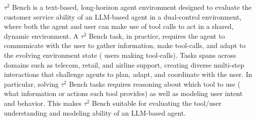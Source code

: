 $\tau^{2}$ Bench \citep{barres2025tau2benchevaluatingconversationalagents} is a text-based, long-horizon agent environment designed to evaluate the customer service ability of an LLM-based agent in a dual-control environment, where both the agent and user can make use of tool calls to act in a shared, dynamic environment.
A $\tau^{2}$ Bench task, in practice, requires the agent to communicate with the user to gather information, make tool-calls, and adapt to the evolving environment state (\eg{} users making tool-calls).
Tasks spans across domains such as telecom, retail, and airline support, creating diverse multi-step interactions that challenge agents to plan, adapt, and coordinate with the user.
In particular, solving $\tau^{2}$ Bench tasks requires reasoning about which tool to use (\eg{} what information or actions each tool provides) as well as modeling user intent and behavior.
This makes $\tau^{2}$ Bench suitable for evaluating the tool/user understanding and modeling ability of an LLM-based agent.

